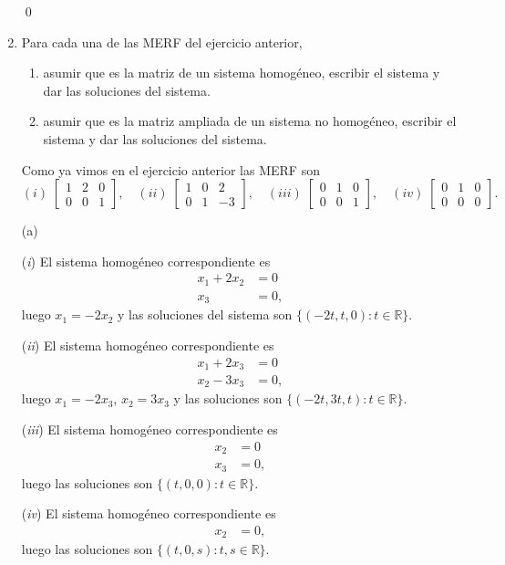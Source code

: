 \begin{enumerate}[topsep=6pt, itemsep=.4cm]
\qed

\item Para cada una de las MERF del ejercicio anterior,
\begin{enumerate}
\item
asumir que es la matriz de un sistema homogéneo, escribir el sistema
y dar las soluciones del sistema.
\item
asumir que es la matriz ampliada de un sistema no homogéneo, escribir el sistema
y dar las soluciones del sistema.
\end{enumerate}

\rta Como ya vimos en el ejercicio anterior las MERF son
$$
(i)\;\begin{bmatrix}1 & 2 & 0 \\0 & 0 & 1 \end{bmatrix}, \quad
(ii)\; \begin{bmatrix}1 & 0 & 2 \\0 & 1 & -3 \end{bmatrix}, \quad
(iii)\;\begin{bmatrix}0 & 1 & 0 \\0 & 0 & 1 \end{bmatrix}, \quad
(iv)\;\begin{bmatrix}0 & 1 & 0 \\0 & 0 & 0 \end{bmatrix}.$$

\noindent (a) 

(\textit{i}) El sistema homogéneo correspondiente  es 
$$\begin{array}{rl}
x_1 +  2x_2 &= 0 \\ x_3&=0, 
\end{array}$$
luego $x_1= -2x_2$ y las soluciones del sistema son $\{ (-2t, t,0): t\in \mathbb R \}$.

(\textit{ii}) El sistema homogéneo correspondiente  es 
$$\begin{array}{rl}
x_1+ 2x_3 &= 0 \\x_2  -3x_3 &= 0,
\end{array}$$
luego $x_1 = -2x_3$, $x_2 = 3x_3$ y las soluciones son $\{ (-2t, 3t,t): t\in \mathbb R \}$.


(\textit{iii}) El sistema homogéneo correspondiente es 
$$\begin{array}{rl}
x_2 &= 0 \\ x_3&=0,
\end{array}$$
luego  las soluciones son $\{ (t, 0,0): t\in \mathbb R \}$.


(\textit{iv}) El sistema homogéneo correspondiente  es 
$$\begin{array}{rl}
x_2&=0,
\end{array}$$
luego  las soluciones son $\{ (t,0,s): t, s\in \mathbb R \}$.



\end{enumerate}

